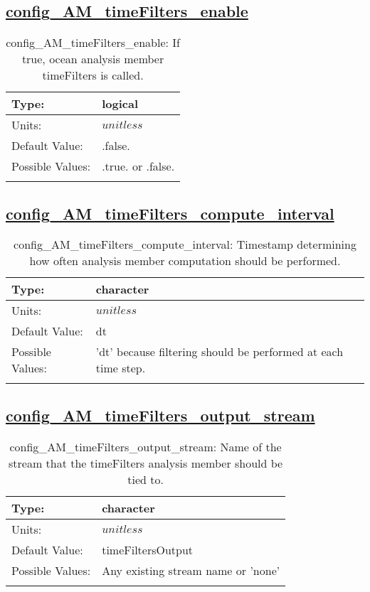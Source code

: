 \subsection[config\_AM\_timeFilters\_enable]{\hyperref[sec:nm_tab_AM_timeFilters]{config\_AM\_timeFilters\_enable}}
\label{subsec:nm_sec_config_AM_timeFilters_enable}
\begin{center}
\begin{longtable}{| p{2.0in} || p{4.0in} |}
    \hline
    Type: & logical \\
    \hline
    Units: & $unitless$ \\
    \hline
    Default Value: & .false. \\
    \hline
    Possible Values: & .true. or .false. \\
    \hline
    \caption{config\_AM\_timeFilters\_enable: If true, ocean analysis member timeFilters is called.}
\end{longtable}
\end{center}
\subsection[config\_AM\_timeFilters\_compute\_interval]{\hyperref[sec:nm_tab_AM_timeFilters]{config\_AM\_timeFilters\_compute\_interval}}
\label{subsec:nm_sec_config_AM_timeFilters_compute_interval}
\begin{center}
\begin{longtable}{| p{2.0in} || p{4.0in} |}
    \hline
    Type: & character \\
    \hline
    Units: & $unitless$ \\
    \hline
    Default Value: & dt \\
    \hline
    Possible Values: & 'dt' because filtering should be performed at each time step. \\
    \hline
    \caption{config\_AM\_timeFilters\_compute\_interval: Timestamp determining how often analysis member computation should be performed.}
\end{longtable}
\end{center}
\subsection[config\_AM\_timeFilters\_output\_stream]{\hyperref[sec:nm_tab_AM_timeFilters]{config\_AM\_timeFilters\_output\_stream}}
\label{subsec:nm_sec_config_AM_timeFilters_output_stream}
\begin{center}
\begin{longtable}{| p{2.0in} || p{4.0in} |}
    \hline
    Type: & character \\
    \hline
    Units: & $unitless$ \\
    \hline
    Default Value: & timeFiltersOutput \\
    \hline
    Possible Values: & Any existing stream name or 'none' \\
    \hline
    \caption{config\_AM\_timeFilters\_output\_stream: Name of the stream that the timeFilters analysis member should be tied to.}
\end{longtable}
\end{center}
